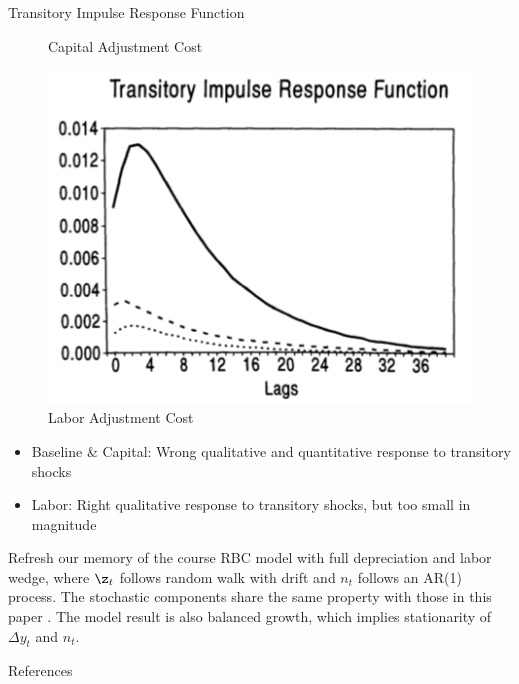 \documentclass[10pt]{beamer}
\begin{document}
\begin{frame}{Transitory Impulse Response Function}
\begin{minipage}{0.33\textwidth}
\begin{figure}
            \caption{Capital Adjustment Cost}
        \end{figure}
    \end{minipage}%
    \begin{minipage}{0.33\textwidth}
        \begin{figure}
            \centering
            \includegraphics[width=\linewidth]{figures/L_trans_IRF.png}
            \caption{Labor Adjustment Cost}
        \end{figure}
    \end{minipage}
    \begin{itemize}
        \item Baseline \& Capital: Wrong qualitative and quantitative response to transitory
              shocks
        \item Labor: Right qualitative response to transitory shocks, but too small in
              magnitude
    \end{itemize}

\end{frame}

\begin{frame}{Refresh our memory of the course}
    RBC model with full depreciation and labor wedge, where $\z_t$ follows random walk with drift and $n_t$ follows an AR(1) process. The stochastic components share the same property with those in this paper \cite{cogley_nason_1995}.
    The model result is also balanced growth, which implies stationarity of $\Delta y_t$ and $n_t$.
\end{frame}

\begin{frame}[allowframebreaks]{References}

    
    

\end{frame}
\end{document}
